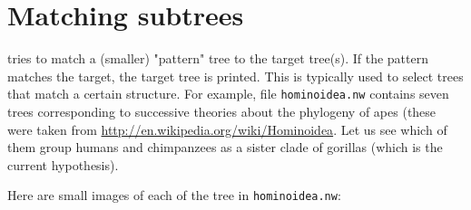 \section{Matching subtrees}
\label{sct_match}

\match{} tries to match a (smaller) "pattern" tree to the target tree(s). If
the pattern matches the target, the target tree is printed. This is typically
used to select trees that match a certain structure. For example, file
\texttt{hominoidea.nw} contains seven trees corresponding to successive
theories about the phylogeny of apes (these were taken from
\url{http://en.wikipedia.org/wiki/Hominoidea}. Let us see which of them group
humans and chimpanzees as a sister clade of gorillas (which is the current
hypothesis).

Here are small images of each of the tree in \texttt{hominoidea.nw}: \\
\bigskip{}
